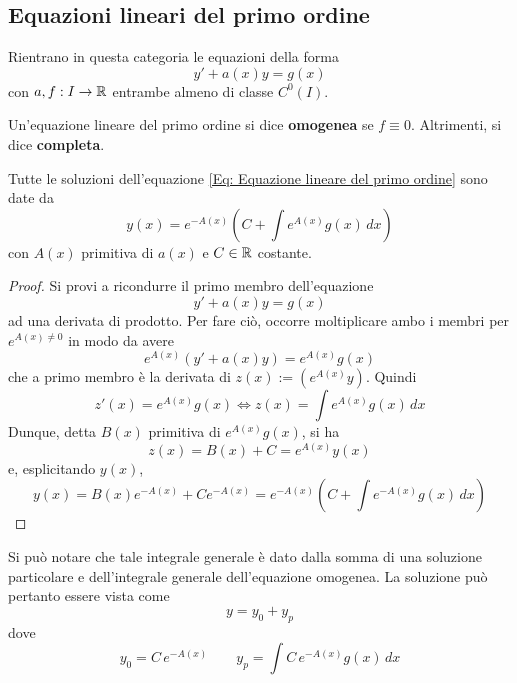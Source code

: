 \subsection{Equazioni lineari del primo ordine}
Rientrano in questa categoria le equazioni della forma
\begin{equation} \label{Eq: Equazione lineare del primo ordine}
    y'+ a(x) y = g(x)
\end{equation}
con $a,f: I \to \mathbb{R}$ entrambe almeno di classe $C^0(I)$.\\
\begin{definition}
    Un'equazione lineare del primo ordine si dice \textbf{omogenea} se $f \equiv 0$. Altrimenti, si dice \textbf{completa}.
\end{definition}
\begin{theorem} \label{Teo: Integrale generale delle ode lineare del primo ordine}
    Tutte le soluzioni dell'equazione \eqref{Eq: Equazione lineare del primo ordine} sono date da
    \begin{equation}
        y(x)=e^{-A(x)}\left(C+ \int{e^{A(x)}g(x)}\,dx\right)
    \end{equation}
    con $A(x)$ primitiva di $a(x)$ e $C \in \mathbb{R}$ costante.
\end{theorem}
\begin{proof} 
Si provi a ricondurre il primo membro  dell'equazione 
\begin{equation}
    y'+ a(x) y = g(x)
\end{equation}
ad una derivata di prodotto. Per fare ciò, occorre moltiplicare ambo i membri per $e^{A(x) \neq 0}$ in modo da avere
\begin{equation}
    e^{A(x)}(y'+a(x)y)= e^{A(x)}g(x)
\end{equation}
che a primo membro è la derivata di $z(x):=\left(e^{A(x)}y \right)$. Quindi
\begin{equation}
    z'(x)= e^{A(x)}g(x) \iff z(x)=\int e^{A(x)}g(x)\,dx
\end{equation}
Dunque, detta $B(x)$ primitiva di $e^{A(x)}g(x)$, si ha
\begin{equation}
 z(x)= B(x)+C= e^{A(x)}y(x)
 \end{equation}
 e, esplicitando $y(x)$,
 \begin{equation}
    y(x)= B(x) e^{-A(x)} + C{e^{-A(x)}} = e^{-A(x)}\left( C + \int e^{-A(x)}g(x)\,dx \right)
 \end{equation}
\end{proof}
\begin{oss}    
Si può notare che tale integrale generale è dato dalla somma di una soluzione particolare e dell'integrale generale dell'equazione omogenea. La soluzione può pertanto essere vista come
\begin{equation}
    y=y_0+ y_p
\end{equation}
dove
\begin{equation}
    y_0= C\, e^{-A(x)} \qquad y_p= \int C\, e^{-A(x)}g(x)\,dx
\end{equation}
\end{oss}
